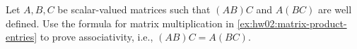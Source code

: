 \begin{exercise}
  \label{ex:hw02:matrix-product-associativity}
  Let \(A,B,C\) be scalar-valued matrices such that \((AB)C\) and
  \(A(BC)\) are well defined. Use the formula for matrix multiplication
  in \autoref{ex:hw02:matrix-product-entries} to prove associativity,
  i.e., \((AB)C=A(BC)\).
\end{exercise}
